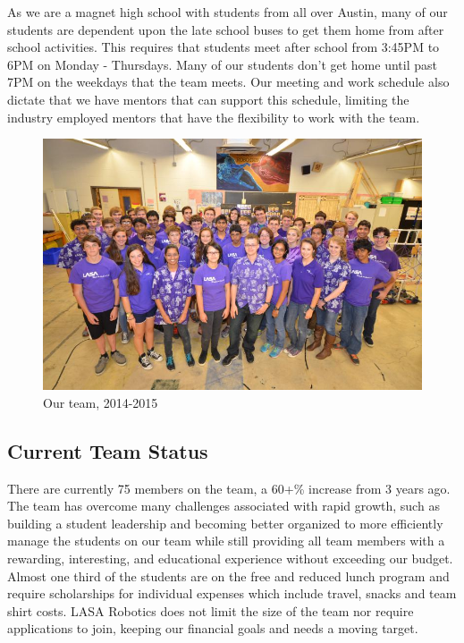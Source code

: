 As we are a magnet high school with students from all over Austin, many of our students are dependent upon the late school buses to get them home from after school activities.  This requires that students meet after school from 3:45PM to 6PM on Monday - Thursdays.  Many of our students don’t get home until past 7PM on the weekdays that the team meets.  Our meeting and work schedule also dictate that we have mentors that can support this schedule, limiting the industry employed mentors that have the flexibility to work with the team.   

\begin{figure}[H]
	\centering
	\includegraphics[width=\linewidth]{teamorg}
	\caption[]{Our team, 2014-2015}
	\label{fig:team}
\end{figure}

\subsection{Current Team Status}
There are currently 75 members on the team, a 60+\% increase from 3 years ago. The team has overcome many challenges associated with rapid growth, such as building a student leadership and becoming better organized to more efficiently manage the students on our team while still providing all team members with a rewarding, interesting, and educational experience without exceeding our budget. Almost one third of the students are on the free and reduced lunch program and require scholarships for individual expenses which include travel, snacks and team shirt costs. LASA Robotics does not limit the size of the team nor require applications to join, keeping our financial goals and needs a moving target. 

